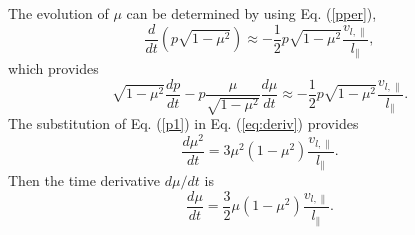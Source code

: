 \documentclass[preprint2,twocolumn,times,tighten]{aastex63}
\begin{document}
{The evolution of $\mu$ can be determined by using Eq. (\ref{pper}),
\begin{equation}
    \frac{d}{dt} (p\sqrt{1-\mu^2}) \approx -\frac{1}{2}p\sqrt{1-\mu^2} \frac{v_{l,\|}}{l_\|},
\end{equation}
which provides
\begin{equation}
    \sqrt{1-\mu^2} \frac{dp}{dt} - p \frac{\mu}{\sqrt{1-\mu^2}} \frac{d\mu}{dt}\approx -\frac{1}{2}p\sqrt{1-\mu^2} \frac{v_{l,\|}}{l_\|}.
    \label{eq:deriv}
\end{equation}
The substitution of Eq. (\ref{p1}) in Eq. (\ref{eq:deriv}) provides
\begin{equation}\label{dmu2new}
    \frac{d\mu^2}{dt} =3\mu^2 (1-\mu^2)  \frac{v_{l,\|}}{l_\|}.
\end{equation}
Then the time derivative $d\mu/dt$ is 
\begin{equation}\label{eq:dmudt}
\frac{d\mu}{dt} = \frac{3}{2} \mu (1-\mu^2) \frac{v_{l,\|}}{l_\|}.
\end{equation}


}
\end{document}
